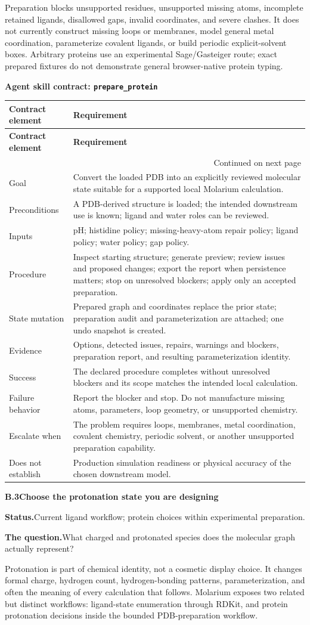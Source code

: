 \documentclass[10pt,letterpaper]{article}
\makeatletter
\newcommand{\code}[1]{\texttt{#1}}
\newcommand{\lead}[1]{\textbf{#1}\hspace{0.35em}}
\newcommand{\workflowsection}[4]{%
  \par\needspace{5\baselineskip}\vspace{7.5pt}%
  {\fontsize{10.91}{13.1}\selectfont\bfseries #1\hspace{1.1em}#2}\par\vspace{2pt}%
  \lead{Status.}#3.\par\vspace{-3.5pt}%
  \lead{The question.}#4\par}
\newenvironment{skillcontract}[1]{%
  \par\needspace{5\baselineskip}\vspace{2pt}%
  {\fontsize{10.91}{13.1}\selectfont\bfseries Agent skill contract: \code{#1}}\par\vspace{1pt}%
  \fontsize{8.4}{10}\selectfont
  \begin{longtable}{@{}K V@{}}
  \toprule
  \textbf{Contract element} & \textbf{Requirement}\\
  \midrule
  \endfirsthead
  \toprule
  \textbf{Contract element} & \textbf{Requirement}\\
  \midrule
  \endhead
  \midrule
  \multicolumn{2}{r}{\footnotesize Continued on next page}\\
  \endfoot
  \bottomrule
  \endlastfoot
}{%
  \end{longtable}
  \normalsize\fontsize{9.96}{11.95}\selectfont}
\newcommand{\contractrow}[2]{#1 & #2\\}
\makeatother
\begin{document}
Preparation blocks unsupported residues, unsupported missing atoms, incomplete retained ligands, disallowed gaps, invalid coordinates, and severe clashes. It does not currently construct missing loops or membranes, model general metal coordination, parameterize covalent ligands, or build periodic explicit-solvent boxes. Arbitrary proteins use an experimental Sage/Gasteiger route; exact prepared fixtures do not demonstrate general browser-native protein typing.

\begin{skillcontract}{prepare\_protein}
\contractrow{Goal}{Convert the loaded PDB into an explicitly reviewed molecular state suitable for a supported local Molarium calculation.}
\contractrow{Preconditions}{A PDB-derived structure is loaded; the intended downstream use is known; ligand and water roles can be reviewed.}
\contractrow{Inputs}{pH; histidine policy; missing-heavy-atom repair policy; ligand policy; water policy; gap policy.}
\contractrow{Procedure}{Inspect starting structure; generate preview; review issues and proposed changes; export the report when persistence matters; stop on unresolved blockers; apply only an accepted preparation.}
\contractrow{State mutation}{Prepared graph and coordinates replace the prior state; preparation audit and parameterization are attached; one undo snapshot is created.}
\contractrow{Evidence}{Options, detected issues, repairs, warnings and blockers, preparation report, and resulting parameterization identity.}
\contractrow{Success}{The declared procedure completes without unresolved blockers and its scope matches the intended local calculation.}
\contractrow{Failure behavior}{Report the blocker and stop. Do not manufacture missing atoms, parameters, loop geometry, or unsupported chemistry.}
\contractrow{Escalate when}{The problem requires loops, membranes, metal coordination, covalent chemistry, periodic solvent, or another unsupported preparation capability.}
\contractrow{Does not establish}{Production simulation readiness or physical accuracy of the chosen downstream model.}
\end{skillcontract}

\workflowsection{B.3}{Choose the protonation state you are designing}{Current ligand workflow; protein choices within experimental preparation}{What charged and protonated species does the molecular graph actually represent?}

Protonation is part of chemical identity, not a cosmetic display choice. It changes formal charge, hydrogen count, hydrogen-bonding patterns, parameterization, and often the meaning of every calculation that follows. Molarium exposes two related but distinct workflows: ligand-state enumeration through RDKit, and protein protonation decisions inside the bounded PDB-preparation workflow.
\end{document}
